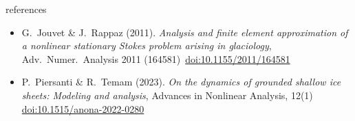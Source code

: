 \documentclass[10pt,dvipsnames]{beamer}
\newcommand{\sdoi}[1]{\,{\scriptsize \href{https://doi.org/#1}{doi:#1}}}
\begin{document}
\begin{frame}[noframenumbering]{references}
\begin{itemize}
\item G.~Jouvet \& J.~Rappaz (2011). \emph{Analysis and finite element approximation of a nonlinear stationary {S}tokes problem arising in glaciology}, Adv.~Numer.~Analysis 2011 (164581) \sdoi{10.1155/2011/164581}
\item P.~Piersanti \& R.~Temam (2023). \emph{On the dynamics of grounded shallow ice sheets: Modeling and analysis}, Advances in Nonlinear Analysis, 12(1) \sdoi{10.1515/anona-2022-0280}
\end{itemize}

\end{frame}
\end{document}
